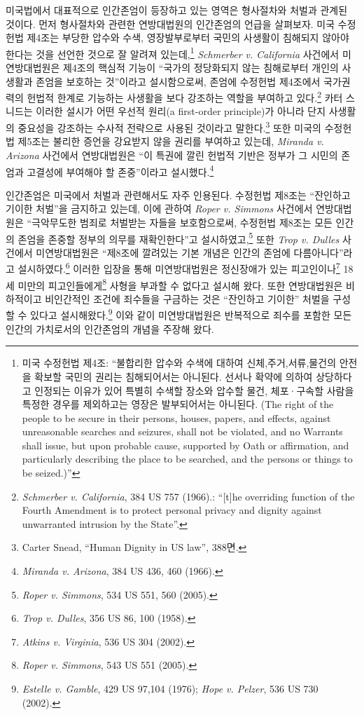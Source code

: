 미국법에서 대표적으로 인간존엄이 등장하고 있는 영역은 형사절차와 처벌과 관계된 것이다. 먼저 형사절차와 관련한 연방대법원의 인간존엄의 언급을 살펴보자. 미국 수정헌법 제4조는 부당한 압수와 수색, 영장발부로부터 국민의 사생활이 침해되지 않아야 한다는 것을 선언한 것으로 잘 알려져 있는데,\footnote{미국 수정헌법 제4조: ``불합리한 압수와 수색에 대하여 신체,주거,서류,물건의 안전을 확보할 국민의 권리는 침해되어서는 아니된다. 선서나 확약에 의하여 상당하다고 인정되는 이유가 있어 특별히 수색할 장소와 압수할 물건, 체포·구속할 사람을 특정한 경우를 제외하고는 영장은 발부되어서는 아니된다. (The right of the people to be secure in their persons, houses, papers, and effects, against unreasonable searches and seizures, shall not be violated, and no Warrants shall issue, but upon probable cause, supported by Oath or affirmation, and particularly describing the place to be searched, and the persons or things to be seized.)''} \emph{Schmerber v. California} 사건에서 미연방대법원은 제4조의 핵심적 기능이 ``국가의 정당화되지 않는 침해로부터 개인의 사생활과 존엄을 보호하는 것''이라고 설시함으로써, 존엄에 수정헌법 제4조에서 국가권력의 헌법적 한계로 기능하는 사생활을 보다 강조하는 역할을 부여하고 있다.\footnote{\emph{Schmerber v. California}, 384 US 757 (1966).: ``{[}t{]}he overriding function of the Fourth Amendment is to protect personal privacy and dignity against unwarranted intrusion by the State''.} 카터 스니드는 이러한 설시가 어떤 우선적 원리(a first-order principle)가 아니라 단지 사생활의 중요성을 강조하는 수사적 전략으로 사용된 것이라고 말한다.\footnote{Carter Snead, ``Human Dignity in US law'', 388면.} 또한 미국의 수정헌법 제5조는 불리한 증언을 강요받지 않을 권리를 부여하고 있는데, \emph{Miranda v. Arizona} 사건에서 연방대법원은 ``이 특권에 깔린 헌법적 기반은 정부가 그 시민의 존엄과 고결성에 부여해야 할 존중''이라고 설시했다.\footnote{\emph{Miranda v. Arizona}, 384 US 436, 460 (1966).}

인간존엄은 미국에서 처벌과 관련해서도 자주 인용된다. 수정헌법 제8조는 ``잔인하고 기이한 처벌''을 금지하고 있는데, 이에 관하여 \emph{Roper v. Simmons} 사건에서 연방대법원은 ``극악무도한 범죄로 처벌받는 자들을 보호함으로써, 수정헌법 제8조는 모든 인간의 존엄을 존중할 정부의 의무를 재확인한다''고 설시하였고,\footnote{\emph{Roper v. Simmons}, 534 US 551, 560 (2005).} 또한 \emph{Trop v. Dulles} 사건에서 미연방대법원은 ``제8조에 깔려있는 기본 개념은 인간의 존엄에 다름아니다''라고 설시하였다.\footnote{\emph{Trop v. Dulles}, 356 US 86, 100 (1958).} 이러한 입장을 통해 미연방대법원은 정신장애가 있는 피고인이나\footnote{\emph{Atkins v. Virginia}, 536 US 304 (2002).} 18세 미만의 피고인들에게\footnote{\emph{Roper v. Simmons}, 543 US 551 (2005).} 사형을 부과할 수 없다고 설시해 왔다. 또한 연방대법원은 비하적이고 비인간적인 조건에 죄수들을 구금하는 것은 ``잔인하고 기이한'' 처벌을 구성할 수 있다고 설시해왔다.\footnote{\emph{Estelle v. Gamble}, 429 US 97,104 (1976); \emph{Hope v. Pelzer}, 536 US 730 (2002).} 이와 같이 미연방대법원은 반복적으로 죄수를 포함한 모든 인간의 가치로서의 인간존엄의 개념을 주장해 왔다.

